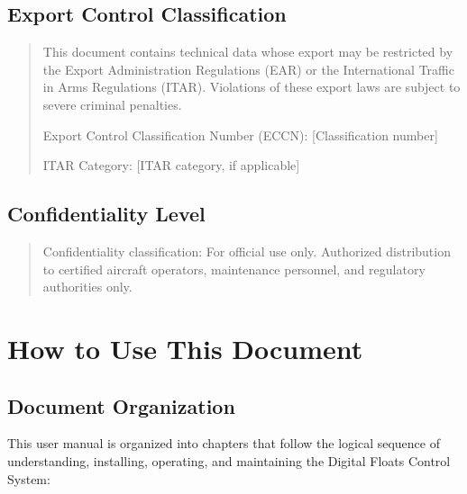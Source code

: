 \documentclass[12pt,a4paper,twoside,openright]{book}
\begin{document}
\subsection{Export Control Classification}

\begin{quote}
This document contains technical data whose export may be restricted by the Export Administration Regulations (EAR) or the International Traffic in Arms Regulations (ITAR). Violations of these export laws are subject to severe criminal penalties.

Export Control Classification Number (ECCN): {\color{missingred}[Classification number]}

ITAR Category: {\color{missingred}[ITAR category, if applicable]}
\end{quote}

\subsection{Confidentiality Level}

\begin{quote}
Confidentiality classification: For official use only. Authorized distribution to certified aircraft operators, maintenance personnel, and regulatory authorities only.
\end{quote}

\section{How to Use This Document}

\subsection{Document Organization}

This user manual is organized into chapters that follow the logical sequence of understanding, installing, operating, and maintaining the Digital Floats Control System:
\end{document}
